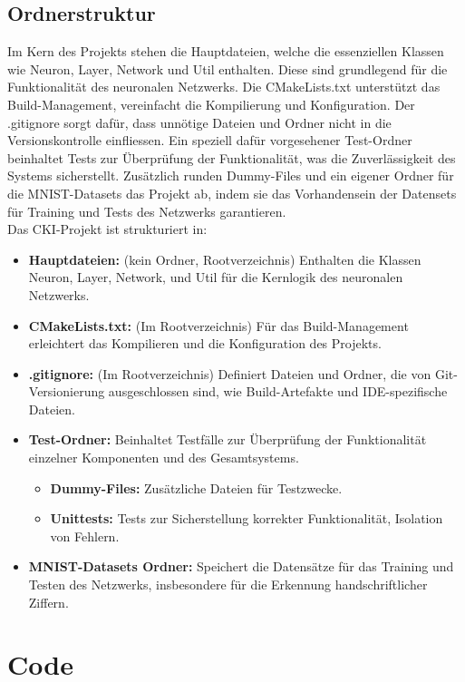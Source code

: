 \subsection{Ordnerstruktur}
\label{sec:RealOrdnerstruktur}
Im Kern des Projekts stehen die Hauptdateien, welche die essenziellen Klassen wie Neuron, Layer, Network und Util enthalten. Diese sind grundlegend für die Funktionalität des neuronalen Netzwerks. Die CMakeLists.txt unterstützt das Build-Management, vereinfacht die Kompilierung und Konfiguration. Der .gitignore sorgt dafür, dass unnötige Dateien und Ordner nicht in die Versionskontrolle einfliessen. Ein speziell dafür vorgesehener Test-Ordner beinhaltet Tests zur Überprüfung der Funktionalität, was die Zuverlässigkeit des Systems sicherstellt. Zusätzlich runden Dummy-Files und ein eigener Ordner für die MNIST-Datasets das Projekt ab, indem sie das Vorhandensein der Datensets für Training und Tests des Netzwerks garantieren.
\\
Das CKI-Projekt ist strukturiert in:
\begin{itemize}
	\item \textbf{Hauptdateien:} (kein Ordner, Rootverzeichnis) 
	Enthalten die Klassen Neuron, Layer, Network, und Util für die Kernlogik des neuronalen Netzwerks.
  \item \textbf{CMakeLists.txt:} (Im Rootverzeichnis)
	Für das Build-Management erleichtert das Kompilieren und die Konfiguration des Projekts.
  \item \textbf{.gitignore:} (Im Rootverzeichnis)
	Definiert Dateien und Ordner, die von Git-Versionierung ausgeschlossen sind, wie Build-Artefakte und IDE-spezifische Dateien.
  \item \textbf{Test-Ordner:} 
	Beinhaltet Testfälle zur Überprüfung der Funktionalität einzelner Komponenten und des Gesamtsystems.
	
	\begin{itemize}
		\item \textbf{Dummy-Files:} 
		Zusätzliche Dateien für Testzwecke. 
		\item \textbf{Unittests:}
		Tests zur Sicherstellung korrekter Funktionalität, Isolation von Fehlern. 
	\end{itemize}
	\item \textbf{MNIST-Datasets Ordner:} 
	Speichert die Datensätze für das Training und Testen des Netzwerks, insbesondere für die Erkennung handschriftlicher Ziffern.
\end{itemize}

\section{Code}
\label{sec:RealCode}
